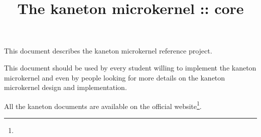 %
%
%
%
%
%

%
%

%
%

\def\path{../..}

%
%



%
%


%
%

\title{The kaneton microkernel :: core \\
       \version
       \logo}

%
%



%
%

\maketitle

%
%

This document describes the kaneton microkernel reference project.

\-

This document should be used by every student willing to implement the
kaneton microkernel and even by people looking for more details on
the kaneton microkernel design and implementation.

\-

All the kaneton documents are available on
  the official website\footnote{}.

%
%

\tableofcontents

%
%

\indentation{}

%
%















